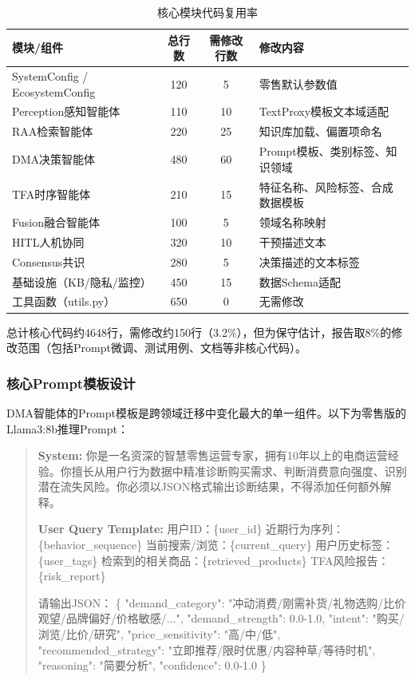 \documentclass[11pt,a4paper]{ctexart}
\theoremstyle{remark}
\begin{document}
\begin{table}[H]
\centering
\caption{核心模块代码复用率}
\begin{tabular}{lccp{3cm}}
\toprule
\textbf{模块/组件} & \textbf{总行数} & \textbf{需修改行数} & \textbf{修改内容} \\
\midrule
SystemConfig / EcosystemConfig & 120 & 5 & 零售默认参数值 \\
Perception感知智能体 & 110 & 10 & TextProxy模板文本域适配 \\
RAA检索智能体 & 220 & 25 & 知识库加载、偏置项命名 \\
DMA决策智能体 & 480 & 60 & Prompt模板、类别标签、知识领域 \\
TFA时序智能体 & 210 & 15 & 特征名称、风险标签、合成数据模板 \\
Fusion融合智能体 & 100 & 5 & 领域名称映射 \\
HITL人机协同 & 320 & 10 & 干预描述文本 \\
Consensus共识 & 280 & 5 & 决策描述的文本标签 \\
基础设施（KB/隐私/监控） & 450 & 15 & 数据Schema适配 \\
工具函数（utils.py） & 650 & 0 & 无需修改 \\
\bottomrule
\end{tabular}
\end{table}

总计核心代码约4648行，需修改约150行（3.2\%），但为保守估计，报告取8\%的修改范围（包括Prompt微调、测试用例、文档等非核心代码）。

\subsubsection{核心Prompt模板设计}

DMA智能体的Prompt模板是跨领域迁移中变化最大的单一组件。以下为零售版的Llama3:8b推理Prompt：

\begin{quote}
\small
\textbf{System:} 你是一名资深的智慧零售运营专家，拥有10年以上的电商运营经验。你擅长从用户行为数据中精准诊断购买需求、判断消费意向强度、识别潜在流失风险。你必须以JSON格式输出诊断结果，不得添加任何额外解释。

\textbf{User Query Template:}
用户ID：\{user\_id\}
近期行为序列：\{behavior\_sequence\}
当前搜索/浏览：\{current\_query\}
用户历史标签：\{user\_tags\}
检索到的相关商品：\{retrieved\_products\}
TFA风险报告：\{risk\_report\}

请输出JSON：
\{
  "demand\_category": "冲动消费/刚需补货/礼物选购/比价观望/品牌偏好/价格敏感/...",
  "demand\_strength": 0.0-1.0,
  "intent": "购买/浏览/比价/研究",
  "price\_sensitivity": "高/中/低",
  "recommended\_strategy": "立即推荐/限时优惠/内容种草/等待时机",
  "reasoning": "简要分析",
  "confidence": 0.0-1.0
\}
\end{quote}
\end{document}
